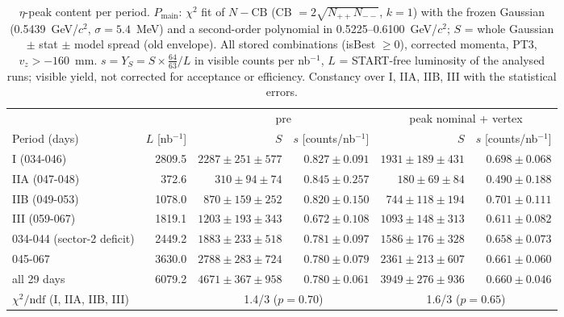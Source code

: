 \begin{table}[H]
\centering\small
\setlength{\tabcolsep}{3pt}
\caption{$\eta$-peak content per period. $P_\mathrm{main}$: $\chi^2$ fit of $N-\mathrm{CB}$ (CB $=2\sqrt{N_{++}N_{--}}$, $k=1$) with the frozen Gaussian (0.5439~GeV/$c^2$, $\sigma=5.4$~MeV) and a second-order polynomial in 0.5225--0.6100~GeV/$c^2$; $S$ = whole Gaussian $\pm$ stat $\pm$ model spread (old envelope). All stored combinations (isBest $\geq 0$), corrected momenta, PT3, $v_z>-160$~mm. $s=Y_S=S\times\frac{64}{63}/L$ in visible counts per nb$^{-1}$, $L$ = START-free luminosity of the analysed runs; visible yield, not corrected for acceptance or efficiency. Constancy over I, IIA, IIB, III with the statistical errors.}
\label{tab:smp_peak_periods}
\begin{tabular}{lr rr rr}
\toprule
 & & \multicolumn{2}{c}{pre} & \multicolumn{2}{c}{peak nominal + vertex} \\
Period (days) & $L$ [nb$^{-1}$] & $S$ & $s$ [counts/nb$^{-1}$] & $S$ & $s$ [counts/nb$^{-1}$] \\
\midrule
I (034-046) & 2809.5 & $2287\pm251\pm577$ & $0.827\pm0.091$ & $1931\pm189\pm431$ & $0.698\pm0.068$ \\
IIA (047-048) & 372.6 & $310\pm94\pm74$ & $0.845\pm0.257$ & $180\pm69\pm84$ & $0.490\pm0.188$ \\
IIB (049-053) & 1078.0 & $870\pm159\pm252$ & $0.820\pm0.150$ & $744\pm118\pm194$ & $0.701\pm0.111$ \\
III (059-067) & 1819.1 & $1203\pm193\pm343$ & $0.672\pm0.108$ & $1093\pm148\pm313$ & $0.611\pm0.082$ \\
\midrule
034-044 (sector-2 deficit) & 2449.2 & $1883\pm233\pm518$ & $0.781\pm0.097$ & $1586\pm176\pm328$ & $0.658\pm0.073$ \\
045-067 & 3630.0 & $2788\pm283\pm724$ & $0.780\pm0.079$ & $2361\pm213\pm607$ & $0.661\pm0.060$ \\
\midrule
all 29 days & 6079.2 & $4671\pm367\pm958$ & $0.780\pm0.061$ & $3949\pm276\pm936$ & $0.660\pm0.046$ \\
\midrule
$\chi^2/\mathrm{ndf}$ (I, IIA, IIB, III) &  & \multicolumn{2}{c}{1.4/3 ($p=0.70$)} & \multicolumn{2}{c}{1.6/3 ($p=0.65$)} \\
\bottomrule
\end{tabular}
\end{table}
